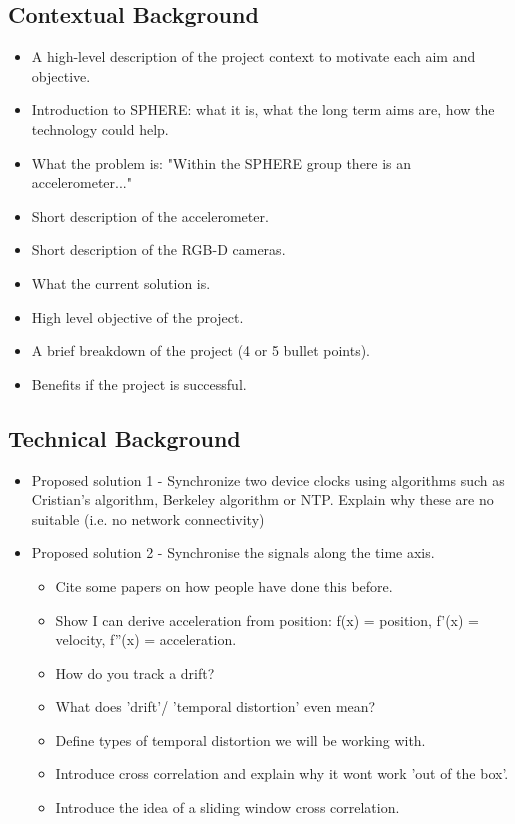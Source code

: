 \documentclass{article}
\begin{document}
\subsection{Contextual Background}
\begin{itemize}
\item A high-level description of the project context to motivate each aim and objective.
\item Introduction to SPHERE: what it is, what the long term aims are, how the technology could help.
\item What the problem is: "Within the SPHERE group there is an accelerometer..."
\item Short description of the accelerometer.
\item Short description of the RGB-D cameras.
\item What the current solution is.
\item High level objective of the project.
\item A brief breakdown of the project (4 or 5 bullet points).
\item Benefits if the project is successful.
\end{itemize}
  


\subsection{Technical Background}
\begin{itemize}
\item Proposed solution 1 - Synchronize two device clocks using algorithms such as Cristian's algorithm, Berkeley algorithm or NTP. Explain why these are no suitable (i.e. no network connectivity)
\item Proposed solution 2 - Synchronise the signals along the time axis.
    \begin{itemize}
    \item Cite some papers on how people have done this before.
    \item Show I can derive acceleration from position: f(x) = position, f'(x) = velocity, f''(x) = acceleration.
    \item How do you track a drift?
    \item What does 'drift'/ 'temporal distortion' even mean?
    \item Define types of temporal distortion we will be working with.
    \item Introduce cross correlation and explain why it wont work 'out of the box'.
    \item Introduce the idea of a sliding window cross correlation.
    \end{itemize}    
\end{itemize}
\end{document}
